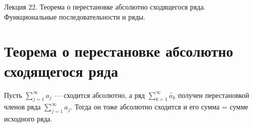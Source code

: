 \documentclass[11pt]{article}
\begin{document}
\begin{titlepage}
    \centering
    \vspace*{\fill}  %

    {\Huge Лекция 22. Теорема о перестановке абсолютно сходящегося ряда. Функциональные последовательности и ряды. 
    \par}

    \vspace*{\fill}  %
\end{titlepage}

\setcounter{page}{1}

\section{ Теорема о перестановке абсолютно сходящегося ряда}


\begin{theorem}
    Пусть $\displaystyle \sum_{j=1}^{\infty} a_j$ --- сходится абсолютно, а ряд $\displaystyle \sum_{k=1}^{\infty} \widetilde{a_k}$ получен перестановкой членов ряда $\displaystyle \sum_{j=1}^{\infty} a_j$. 
    Тогда он тоже абсолютно сходится и его сумма = сумме исходного ряда. 
\end{theorem}
\end{document}
